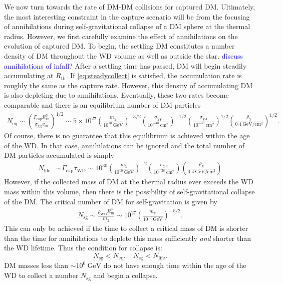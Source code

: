 \documentclass[preprintnumbers,amsmath,amssymb,prd,superscriptaddress]{revtex4}
\newcommand{\GeV}{\text{GeV}}
\newcommand{\cm}{\text{cm}}
\def\r{\right)}
\def\l{\left(}
\begin{document}
We now turn towards the rate of DM-DM collisions for captured DM. 
Ultimately, the most interesting constraint in the capture scenario will be from the focusing of annihilations during self-gravitational collapse of a DM sphere at the thermal radius.
However, we first carefully examine the effect of annihilations on the evolution of captured DM. 
To begin, the settling DM constitutes a number density of DM throughout the WD volume as well as outside the star. 
\textcolor{blue}{discuss annihilations of infall?}
After a settling time has passed, DM will begin steadily accumulating at $R_\text{th}$.
If \eqref{eq:steadycollect} is satisfied, the accumulation rate is roughly the same as the capture rate. 
However, this density of accumulating DM is also depleting due to annihilations. 
Eventually, these two rates become comparable and there is an equilibrium number of DM particles
\begin{align}
N_\text{eq} \sim \l \frac{\Gamma_\text{cap} R_\text{th}^3}{\sigma_{\chi \chi} v_\text{th}} \r^{1/2} \sim 5 \times 10^{27} \l \frac{m_\chi}{10^{10} ~\GeV} \r^{-3/2} \l \frac{\sigma_{\chi \chi}}{10^{-40} ~\cm^2} \r^{-1/2}  \l \frac{\sigma_{\chi A}}{10^{-38} ~\cm^2} \r^{1/2} \l \frac{\rho_\chi}{0.4 ~\GeV/\cm^3} \r^{1/2}.
\end{align}
Of course, there is no guarantee that this equilibrium is achieved within the age of the WD. 
In that case, annihilations can be ignored and the total number of DM particles accumulated is simply
\begin{align}
N_\text{life} &\sim \Gamma_\text{cap} \tau_\text{WD} \sim 10^{30}  \l \frac{m_\chi}{10^{10} ~\GeV} \r^{-2}  \l \frac{\sigma_{\chi A}}{10^{-38} ~\cm^2} \r \l \frac{\rho_\chi}{0.4 ~\GeV/\cm^3} \r
\end{align}
However, if the collected mass of DM at the thermal radius ever exceeds the WD mass within this volume, then there is the possibility of self-gravitational collapse of the DM.
The critical number of DM for self-gravitation is given by
\begin{align}
\label{eq:Ncore}
    N_\text{sg} \sim \frac{\rho_\text{WD} R^3_\text{th}}{m_\chi} \sim 10^{27} \l \frac{m_\chi}{10^{10} ~\GeV} \r^{-5/2}.
\end{align}
This can only be achieved if the time to collect a critical mass of DM is shorter than the time for annihilations to deplete this mass sufficiently \emph{and} shorter than the WD lifetime. 
Thus the condition for collapse is:
\begin{equation}
\label{eq:collapsecondition}
N_\text{sg} < N_\text{eq}, ~~~~ N_\text{sg} < N_\text{life}. 
\end{equation}
DM masses less than $\sim 10^{6} ~\GeV$ do not have enough time within the age of the WD to collect a number $N_\text{sg}$ and begin a collapse.
\end{document}
